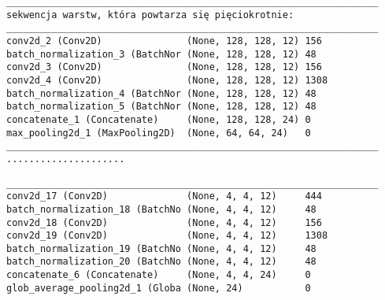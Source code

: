 {\begin{lrbox}{\myvv}
\begin{minipage}{\myminipagewidth}
\begin{verbatim}
\end{verbatim} 
\end{minipage}\end{lrbox}
\resizebox{0.75\textwidth}{!}{\usebox\myvv}

\newsavebox\myvvv
\begin{lrbox}{\myvvv}
\setlength{\myminipagewidth}{0.9\linewidth} %
\setlength{\myminipagecentering}{(\linewidth-\myminipagewidth)/2}
\noindent\hspace{\myminipagecentering}\begin{minipage}{\myminipagewidth}
\begin{verbatim}
__________________________________________________________________
sekwencja warstw, która powtarza się pięciokrotnie:
__________________________________________________________________
conv2d_2 (Conv2D)               (None, 128, 128, 12) 156       
batch_normalization_3 (BatchNor (None, 128, 128, 12) 48                   
conv2d_3 (Conv2D)               (None, 128, 128, 12) 156       
conv2d_4 (Conv2D)               (None, 128, 128, 12) 1308        
batch_normalization_4 (BatchNor (None, 128, 128, 12) 48                    
batch_normalization_5 (BatchNor (None, 128, 128, 12) 48                     
concatenate_1 (Concatenate)     (None, 128, 128, 24) 0       
max_pooling2d_1 (MaxPooling2D)  (None, 64, 64, 24)   0            
__________________________________________________________________
.....................

\end{verbatim} 
\end{minipage}\end{lrbox}
\resizebox{0.75\textwidth}{!}{\usebox\myvvv}

\newsavebox\myvvvv
\begin{lrbox}{\myvvvv}
\setlength{\myminipagewidth}{0.9\linewidth} %
\setlength{\myminipagecentering}{(\linewidth-\myminipagewidth)/2}
\noindent\hspace{\myminipagecentering}\begin{minipage}{\myminipagewidth}
\begin{verbatim}
__________________________________________________________________
conv2d_17 (Conv2D)              (None, 4, 4, 12)     444         
batch_normalization_18 (BatchNo (None, 4, 4, 12)     48             
conv2d_18 (Conv2D)              (None, 4, 4, 12)     156     
conv2d_19 (Conv2D)              (None, 4, 4, 12)     1308   
batch_normalization_19 (BatchNo (None, 4, 4, 12)     48                
batch_normalization_20 (BatchNo (None, 4, 4, 12)     48                 
concatenate_6 (Concatenate)     (None, 4, 4, 24)     0       
glob_average_pooling2d_1 (Globa (None, 24)           0             
\end{verbatim} 
\end{minipage}\end{lrbox}
\resizebox{0.75\textwidth}{!}{\usebox\myvvvv}

}
